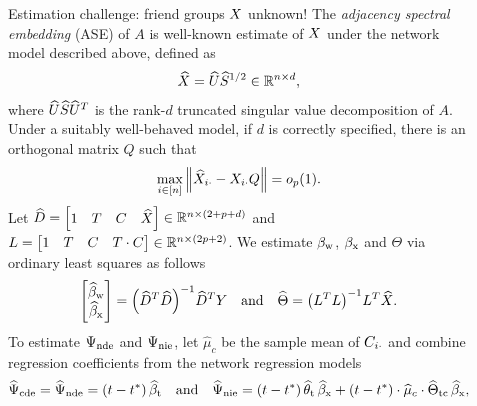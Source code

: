\documentclass[final]{beamer}
\newlength{\sepwidth}
\newlength{\colwidth}
\newcommand{\separatorcolumn}{\begin{column}{\sepwidth}\end{column}}
\begin{document}
\begin{frame}[t]
\begin{columns}[t]
\begin{column}{\colwidth}
\begin{block}{Estimation challenge: friend groups $X$ unknown!}
        The \emph{adjacency spectral embedding} (ASE) of $A$ is well-known estimate of $X$ under the network model described above, defined as
        \begin{equation*}
          \widehat{X} = \widehat{U} \widehat{S}^{1/2} \in \mathbb{R}^{n \times d},
        \end{equation*}
        where $\widehat{U} \widehat{S} \widehat{U}^T$ is the rank-$d$ truncated singular value decomposition of $A$. Under a suitably well-behaved model, if $d$ is correctly specified, there is an orthogonal matrix $Q$ such that
        \begin{equation*}
          \max_{i \in [n]} \, \norm*{\Xhat_{i \cdot} - \X_{i \cdot} Q} = \op{1}.
        \end{equation*}
        Let $\widehat{D} = \begin{bmatrix} 1 & T & C& \widehat{X} \end{bmatrix} \in \mathbb{R}^{n \times (2 + p + d)}$ and $L = \begin{bmatrix} 1 & T & C & T \cdot C \end{bmatrix} \in \mathbb{R}^{n \times (2 p + 2)}$. We estimate $\beta_\text{w}$, $\beta_\text{x}$ and $\Theta$ via ordinary least squares as follows
        \begin{equation*}
          \begin{bmatrix}
            \betawhat \\
            \betaxhat
          \end{bmatrix}
          = \paren*{\Dhat^T \Dhat}^{-1} \Dhat^T Y
          \quad \text{and} \quad
          \Thetahat
          = \paren*{\Wfull^T \Wfull}^{-1} \Wfull^T \Xhat.
        \end{equation*}
        To estimate $\Psi_\mathrm{nde}$ and $\Psi_\mathrm{nie}$, let $\widehat{\mu}_c$ be the sample mean of $C_{i \cdot}$ and combine regression coefficients from the network regression models
        \begin{align*}
          \cdehat  = \ndehat = \paren*{t - t^*} \, \betathat                                                                               
          \quad \text{and} \quad
          \niehat  = \paren*{t - t^*} \, \thetathat \, \betaxhat + \paren*{t - t^*} \cdot \widehat{\mu}_c \cdot \Thetatchat \, \betaxhat,
        \end{align*}
      \end{block}


    \end{column}

    \separatorcolumn

    \begin{column}{\colwidth}


\end{column}
\end{columns}
\end{frame}
\end{document}
